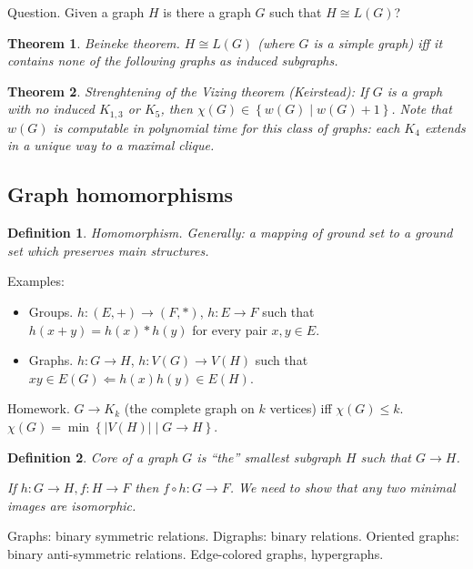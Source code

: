 \documentclass[12pt,a4paper]{article}
\newtheorem{theorem}{Theorem}
\newtheorem{definition}{Definition}
\begin{document}
Question. Given a graph \(H\) is there a graph \(G\) such that \(H \cong L(G)\)?

\begin{theorem}
  Beineke theorem.
  \(H \cong L(G)\) (where \(G\) is a simple graph) iff it contains none of the
  following graphs as induced subgraphs.
\end{theorem}

\begin{theorem}
  Strenghtening of the Vizing theorem (Keirstead): If \(G\) is a graph with no
  induced \(K_{1,3}\) or \(K_5\), then
  \(\chi(G) \in \left\{w(G) \middle| w(G) + 1\right\}\). Note that \(w(G)\) is
  computable in polynomial time for this class of graphs: each \(K_4\) extends
  in a unique way to a maximal clique.
\end{theorem}

\subsection{Graph homomorphisms}

\begin{definition}
  Homomorphism. Generally: a mapping of ground set to a ground set which
  preserves main structures.
\end{definition}

Examples:
\begin{itemize}
\item Groups. \(h: (E, +) \to (F, *)\), \(h: E \to F\) such that
  \(h(x + y) = h(x) * h(y)\) for every pair \(x, y \in E\).
\item Graphs. \(h: G \to H\), \(h: V(G) \to V(H)\) such that \(xy \in E(G)
  \Leftarrow h(x)h(y) \in E(H)\).
\end{itemize}

Homework. \(G \to K_k\) (the complete graph on \(k\) vertices) iff \(\chi(G)
\leq k\). \(\chi(G) = \min\left\{|V(H)| \middle| G \to H\right\}\).

\begin{definition}
  Core of a graph \(G\) is \enquote{the} smallest subgraph \(H\) such that \(G
  \to H\).

  If \(h: G \to H, f: H \to F\) then \(f \circ h: G \to F\).  We need to show
  that any two minimal images are isomorphic.
\end{definition}

Graphs: binary symmetric relations.
Digraphs: binary relations.
Oriented graphs: binary anti-symmetric relations.
Edge-colored graphs, hypergraphs.
\end{document}
